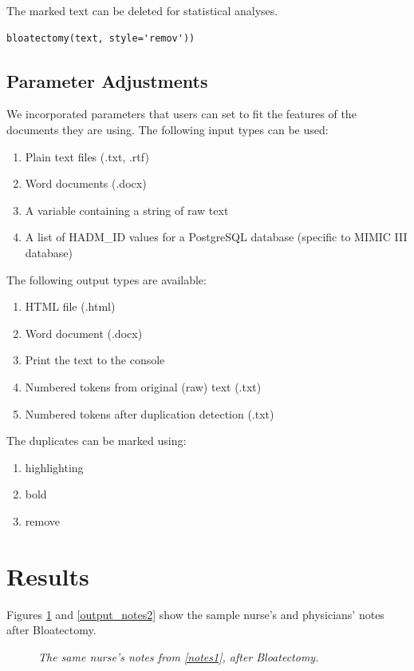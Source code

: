 \documentclass[runningheads,a4paper]{llncs}
\begin{document}
\noindent The marked text can be deleted for statistical analyses.  

\begin{lstlisting}[frame=single, style=customcode]
bloatectomy(text, style='remov'))
\end{lstlisting}

\subsection{Parameter Adjustments}
\noindent We incorporated parameters that users can set to fit the features of the documents they are using. The following input types can be used:
\begin{enumerate}
\item
Plain text files (.txt, .rtf)
\item
Word documents (.docx)
\item
A variable containing a string of raw text
\item
A list of HADM\_ID values for a PostgreSQL database (specific to MIMIC III database)
\end{enumerate}



\noindent The following output types are available:
\begin{enumerate}
\item
HTML file (.html)
\item
Word document (.docx)
\item
Print the text to the console
\item
Numbered tokens from original (raw) text (.txt)
\item
Numbered tokens after duplication detection (.txt)  
\end{enumerate}



\noindent The duplicates can be marked using:
\begin{enumerate}
\item
highlighting
\item
bold
\item
remove
\end{enumerate}

\section{Results}
\noindent Figures \ref{output_notes1} and \ref{output_notes2} show the sample nurse's and physicians’ notes after Bloatectomy.

\begin{figure}
 \caption {\emph{ The same nurse’s notes from \ref{notes1}, after Bloatectomy.} }
 \label{output_notes1}
\end{figure}
\end{document}
